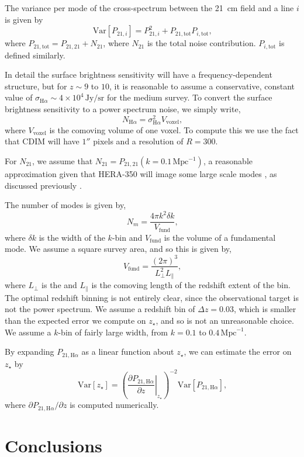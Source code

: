 \documentclass[a4paper,fleqn,usenatbib]{mnras}
\newcommand{\beq}{\begin{equation}}
\newcommand{\eeq}{\end{equation}}
\newcommand{\Ha}{\ensuremath{\text{H}\alpha}}
\newcommand{\Mpc}{\ensuremath{\text{Mpc}}}
\newcommand{\zst}{\ensuremath{z_{\star}}}
\newcommand{\Var}[1]{\mathrm{Var}[#1]}
\begin{document}
The variance per mode of the cross-spectrum between the 21~cm field and a line
$i$ is given by \citep[e.g.][]{2007ApJ...660.1030F}
\beq \label{eq:var_xps}
\Var{P_{21,i}} = P_{21,i}^2 + 
                                  P_{21,\text{tot}} P_{i,\text{tot}}\text{,}
\eeq
where $P_{21,\text{tot}} = P_{21,21} + N_{21}$, where $N_{21}$ is the total
noise contribution. $P_{i,\text{tot}}$ is defined similarly.

In detail the surface brightness sensitivity will have a frequency-dependent
structure, but for $z\sim9$ to $10$, it is reasonable to assume a
conservative, constant value of
$\sigma_{\Ha}\sim4\times10^4\,\text{Jy}/\text{sr}$ for the medium survey. To
convert the surface brightness sensitivity to a power spectrum noise, we simply
write,
\beq \label{eq:ps_}
N_{\Ha} = \sigma_{\Ha}^2 V_{\text{voxel}}\text{,}
\eeq 
where $V_{\text{voxel}}$ is the comoving volume of one voxel. To compute this
we use the fact that CDIM will have $1''$ pixels and a resolution of $R=300$.

For
$N_{21}$, we assume that $N_{21} = P_{21,21}(k=0.1\,\text{Mpc}^{-1})$, a
reasonable approximation given that HERA-350 will image some large scale modes
\citep{2017PASP..129d5001D}, as discussed previously \citep{2018ApJ...867...26B}.

The number of modes is given by,
\beq \label{eq:nmodes}
N_m = \frac{4\pi k^2 \delta k}{V_{\text{fund}}}\text{,}
\eeq
where $\delta k$ is the width of the $k$-bin and $V_{\text{fund}}$ is the
volume of a fundamental mode. We assume a square survey area, and so this is
given by,
\beq \label{eq:fund}
V_{\text{fund}} = \frac{(2 \pi)^3}{L_{\perp}^2 L_{\parallel}}\text{,}
\eeq
where $L_{\perp}$ is the  and $L_{\parallel}$ is the comoving length of the
redshift extent of the bin. The optimal redshift binning is not entirely
clear, since the observational target is not the power spectrum. We assume a
redshift bin of $\Delta z = 0.03$, which is smaller than the expected error we
compute on \zst{}, and so is not an unreasonable choice. We assume a $k$-bin
of fairly large width, from $k=0.1$ to $0.4\,\Mpc^{-1}$.

By expanding $P_{21,\Ha}$ as a linear function about \zst{}, we can estimate the
error on \zst{} by
\beq \label{eq:error_on_zst}
\Var{\zst} = \left(\left.\frac{\partial P_{21,\Ha}}{\partial z}\right|_{\zst}\right)^{-2} \Var{P_{21,\Ha}}\text{,}
\eeq
where ${\partial P_{21,\Ha}}/{\partial z}$ is computed numerically.


\section{Conclusions} \label{sec:conclusions}
\end{document}
